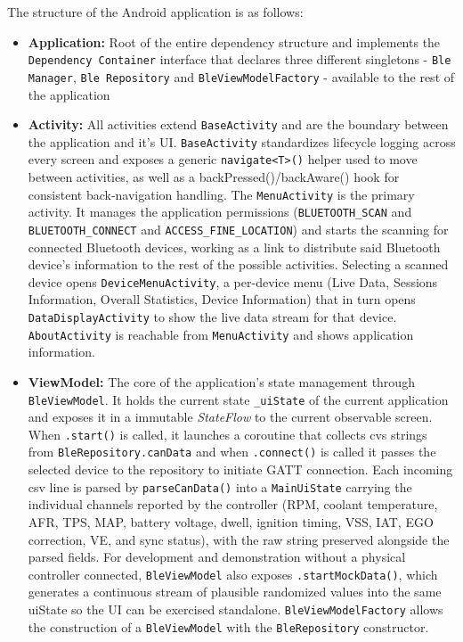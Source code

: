 The structure of the Android application is as follows:
\begin{itemize}
    \item \textbf{Application:} Root of the entire dependency structure and implements the \texttt{Dependency Container} interface that declares three different singletons - \texttt{Ble Manager}, \texttt{Ble Repository} and \texttt{BleViewModelFactory} - available to the rest of the application
    \item  \textbf{Activity:} All activities extend \texttt{BaseActivity} and are the boundary between the application and it's UI. \texttt{BaseActivity} standardizes lifecycle logging across every screen and exposes a generic \texttt{navigate<T>()} helper used to move between activities, as well as a {backPressed()/backAware()} hook for consistent back-navigation handling. The \texttt{MenuActivity} is the primary activity. It manages the application permissions (\texttt{BLUETOOTH\_SCAN} and \texttt{BLUETOOTH\_CONNECT} and \texttt{ACCESS\_FINE\_LOCATION}) and starts the scanning for connected Bluetooth devices, working as a link to distribute said Bluetooth device's information to the rest of the possible activities. Selecting a scanned device opens \texttt{DeviceMenuActivity}, a per-device menu (Live Data, Sessions Information, Overall Statistics, Device Information) that in turn opens \texttt{DataDisplayActivity} to show the live data stream for that device. \texttt{AboutActivity} is reachable from \texttt{MenuActivity} and shows application information.
    \item \textbf{ViewModel:} The core of the application's state management through \texttt{BleViewModel}. It holds the current state \texttt{\_uiState} of the current application and exposes it in a immutable \textit{StateFlow} to the current observable screen. When \texttt{.start()} is called, it launches a coroutine that collects cvs strings from \texttt{BleRepository.canData} and when \texttt{.connect()} is called it passes the selected device to the repository to initiate GATT connection. Each incoming csv line is parsed by \texttt{parseCanData()} into a \texttt{MainUiState} carrying the individual channels reported by the controller (RPM, coolant temperature, AFR, TPS, MAP, battery voltage, dwell, ignition timing, VSS, IAT, EGO correction, VE, and sync status), with the raw string preserved alongside the parsed fields. For development and demonstration without a physical controller connected, \texttt{BleViewModel} also exposes \texttt{.startMockData()}, which generates a continuous stream of plausible randomized values into the same uiState so the UI can be exercised standalone. \texttt{BleViewModelFactory} allows the construction of a \texttt{BleViewModel} with the \texttt{BleRepository} constructor.

\end{itemize}
